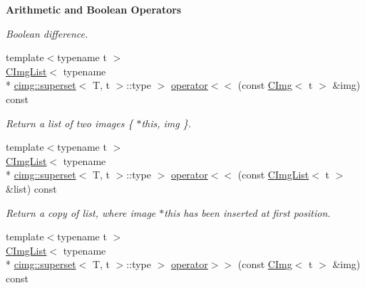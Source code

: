 \begin{Indent}{\bf Arithmetic and Boolean Operators}
\begin{DoxyCompactItemize}
\begin{DoxyCompactList}\small\item\em Boolean difference. \end{DoxyCompactList}\item 
\hypertarget{structcimg__library_1_1_c_img_a3e976543e913c0b6bdb8cf5494c06bf9}{{\footnotesize template$<$typename t $>$ }\\\hyperlink{structcimg__library_1_1_c_img_list}{C\-Img\-List}$<$ typename \\*
\hyperlink{structcimg__library_1_1cimg_1_1superset}{cimg\-::superset}$<$ T, t $>$\-::type $>$ \hyperlink{structcimg__library_1_1_c_img_a3e976543e913c0b6bdb8cf5494c06bf9}{operator$<$$<$} (const \hyperlink{structcimg__library_1_1_c_img}{C\-Img}$<$ t $>$ \&img) const }\label{structcimg__library_1_1_c_img_a3e976543e913c0b6bdb8cf5494c06bf9}

\begin{DoxyCompactList}\small\item\em Return a list of two images \{ $\ast$this, img \}. \end{DoxyCompactList}\item 
\hypertarget{structcimg__library_1_1_c_img_a09f114e1dab65dc461f465f62565ebc2}{{\footnotesize template$<$typename t $>$ }\\\hyperlink{structcimg__library_1_1_c_img_list}{C\-Img\-List}$<$ typename \\*
\hyperlink{structcimg__library_1_1cimg_1_1superset}{cimg\-::superset}$<$ T, t $>$\-::type $>$ \hyperlink{structcimg__library_1_1_c_img_a09f114e1dab65dc461f465f62565ebc2}{operator$<$$<$} (const \hyperlink{structcimg__library_1_1_c_img_list}{C\-Img\-List}$<$ t $>$ \&list) const }\label{structcimg__library_1_1_c_img_a09f114e1dab65dc461f465f62565ebc2}

\begin{DoxyCompactList}\small\item\em Return a copy of {\ttfamily list}, where image $\ast$this has been inserted at first position. \end{DoxyCompactList}\item 
\hypertarget{structcimg__library_1_1_c_img_a00d6540b90ff26f5fba0c14c0c17fd5d}{{\footnotesize template$<$typename t $>$ }\\\hyperlink{structcimg__library_1_1_c_img_list}{C\-Img\-List}$<$ typename \\*
\hyperlink{structcimg__library_1_1cimg_1_1superset}{cimg\-::superset}$<$ T, t $>$\-::type $>$ \hyperlink{structcimg__library_1_1_c_img_a00d6540b90ff26f5fba0c14c0c17fd5d}{operator$>$$>$} (const \hyperlink{structcimg__library_1_1_c_img}{C\-Img}$<$ t $>$ \&img) const }\label{structcimg__library_1_1_c_img_a00d6540b90ff26f5fba0c14c0c17fd5d}


\end{DoxyCompactItemize}
\end{Indent}
